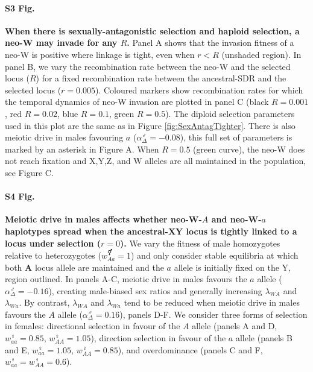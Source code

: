 \documentclass[10pt,letterpaper]{article}
\begin{document}
\paragraph*{S3 Fig.}
\label{fig:SexAntagTighterMaleDrive}
{\bf  When there is sexually-antagonistic selection and haploid selection, a neo-W may invade for any $R$.}
Panel A shows that the invasion fitness of a neo-W is positive where linkage is tight, even when $r<R$ (unshaded region).
In panel B, we vary the recombination rate between the neo-W and the selected locus ($R$) for a fixed recombination rate between the ancestral-SDR and the selected locus ($r=0.005$).
Coloured markers show recombination rates for which the temporal dynamics of neo-W invasion are plotted in panel C (black $R=0.001$, red $R=0.02$, blue $R=0.1$, green $R=0.5$). 
The diploid selection parameters used in this plot are the same as in Figure \ref{fig:SexAntagTighter}. 
There is also meiotic drive in males favouring $a$ ($\alpha_{\Delta}^\male=-0.08$), this full set of parameters is marked by an asterisk in Figure A.
When $R=0.5$ (green curve), the neo-W does not reach fixation and X,Y,Z, and W alleles are all maintained in the population, see Figure C.

\paragraph*{S4 Fig.}
\label{fig:regionMaleDrive}
{\bf Meiotic drive in males affects whether neo-W-$A$ and neo-W-$a$ haplotypes spread when the ancestral-XY locus is tightly linked to a locus under selection ($r=0$).}
We vary the fitness of male homozygotes relative to heterozygotes ($w_{Aa}^\Hermaphrodite=1$) and only consider stable equilibria at which both \textbf{A} locus allele are maintained and the $a$ allele is initially fixed on the Y, region outlined. 
In panels A-C, meiotic drive in males favours the $a$ allele ($\alpha_{\Delta}^\male=-0.16$), creating male-biased sex ratios and generally increasing $\lambda_{WA}$ and $\lambda_{Wa}$. 
By contrast, $\lambda_{WA}$ and $\lambda_{Wa}$ tend to be reduced when meiotic drive in males favours the $A$ allele ($\alpha_{\Delta}^\male=0.16$), panels D-F. 
We consider three forms of selection in females: directional selection in favour of the $A$ allele (panels A and D, $w_{aa}^\female=0.85$, $w_{AA}^\female=1.05$), direction selection in favour of the $a$ allele (panels B and E, $w_{aa}^\female=1.05$, $w_{AA}^\female=0.85$), and overdominance (panels C and F, $w_{aa}^\female=w_{AA}^\female=0.6$).
\end{document}
